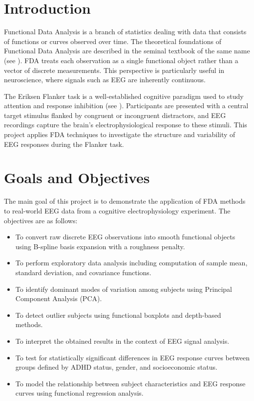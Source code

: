 \documentclass[twoside,11pt]{article}
\begin{document}
\section{Introduction}

Functional Data Analysis is a branch of statistics dealing with data that consists of functions or
curves observed over time. The theoretical foundations of Functional Data Analysis are described in
the seminal textbook of the same name (see \cite{ramsay2006functional}). FDA treats each observation
as a single functional object rather than a vector of discrete measurements. This perspective is
particularly useful in neuroscience, where signals such as EEG are inherently continuous.

The Eriksen Flanker task is a well-established cognitive paradigm used to study attention and
response inhibition (see \cite{Eriksen1974}). Participants are presented with a central target
stimulus flanked by congruent or incongruent distractors, and EEG recordings capture the brain's
electrophysiological response to these stimuli. This project applies FDA techniques to investigate
the structure and variability of EEG responses during the Flanker task.

\section{Goals and Objectives}

The main goal of this project is to demonstrate the application of FDA methods to real-world EEG
data from a cognitive electrophysiology experiment. The objectives are as follows:

\begin{itemize}[
  itemsep=5pt,
  topsep=2pt,
  parsep=0pt,
  partopsep=0pt
]
  \item To convert raw discrete EEG observations into smooth functional objects using B-spline basis
    expansion with a roughness penalty.
  \item To perform exploratory data analysis including computation of sample mean, standard
    deviation, and covariance functions.
  \item To identify dominant modes of variation among subjects using Principal Component Analysis
    (PCA).
  \item To detect outlier subjects using functional boxplots and depth-based methods.
  \item To interpret the obtained results in the context of EEG signal analysis.
  \item To test for statistically significant differences in EEG response curves between groups
    defined by ADHD status, gender, and socioeconomic status.
  \item To model the relationship between subject characteristics and EEG response curves using
    functional regression analysis.
\end{itemize}
\end{document}
